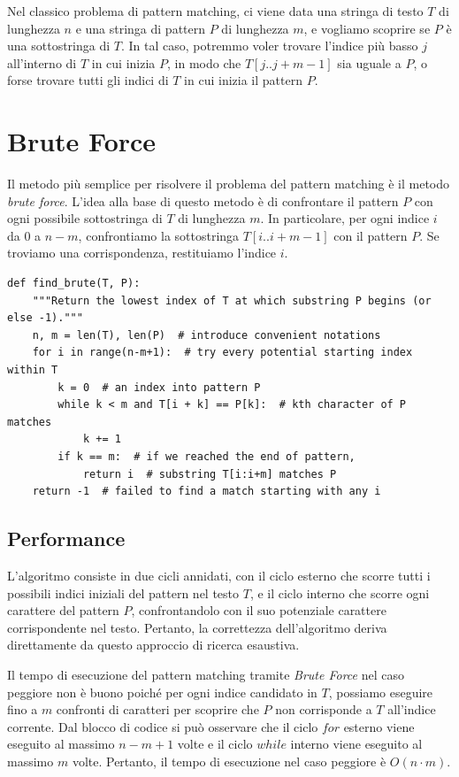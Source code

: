 \vspace{1\baselineskip}
\noindent
Nel classico problema di pattern matching, ci viene data una stringa di testo $T$ di lunghezza $n$ e una stringa di pattern $P$ di lunghezza $m$, e vogliamo scoprire se $P$ è una sottostringa di $T$. In tal caso, potremmo voler trovare l'indice più basso $j$ all'interno di $T$ in cui inizia $P$, in modo che $T[j..j+m-1]$ sia uguale a $P$, o forse trovare tutti gli indici di $T$ in cui inizia il pattern $P$.

\clearpage
\section{Brute Force}
Il metodo più semplice per risolvere il problema del pattern matching è il metodo \textit{brute force}. L'idea alla base di questo metodo è di confrontare il pattern $P$ con ogni possibile sottostringa di $T$ di lunghezza $m$. In particolare, per ogni indice $i$ da $0$ a $n-m$, confrontiamo la sottostringa $T[i..i+m-1]$ con il pattern $P$. Se troviamo una corrispondenza, restituiamo l'indice $i$.

\vspace{1\baselineskip}
\begin{lstlisting}
def find_brute(T, P):
    """Return the lowest index of T at which substring P begins (or else -1)."""
    n, m = len(T), len(P)  # introduce convenient notations
    for i in range(n-m+1):  # try every potential starting index within T
        k = 0  # an index into pattern P
        while k < m and T[i + k] == P[k]:  # kth character of P matches
            k += 1
        if k == m:  # if we reached the end of pattern,
            return i  # substring T[i:i+m] matches P
    return -1  # failed to find a match starting with any i
\end{lstlisting}
\vspace{1\baselineskip}


\subsection*{Performance}
L'algoritmo consiste in due cicli annidati, con il ciclo esterno che scorre tutti i possibili indici iniziali del pattern nel testo $T$, e il ciclo interno che scorre ogni carattere del pattern $P$, confrontandolo con il suo potenziale carattere corrispondente nel testo. Pertanto, la correttezza dell'algoritmo deriva direttamente da questo approccio di ricerca esaustiva.

Il tempo di esecuzione del pattern matching tramite \emph{Brute Force} nel caso peggiore non è buono poiché per ogni indice candidato in $T$, possiamo eseguire fino a $m$ confronti di caratteri per scoprire che $P$ non corrisponde a $T$ all'indice corrente. Dal blocco di codice si può osservare che il ciclo $for$ esterno viene eseguito al massimo $n-m+1$ volte e il ciclo $while$ interno viene eseguito al massimo $m$ volte. Pertanto, il tempo di esecuzione nel caso peggiore è $O(n \cdot m)$.

